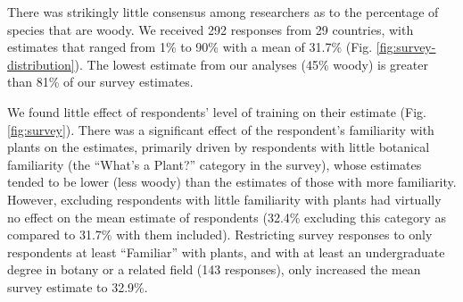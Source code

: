There was strikingly little consensus among researchers as to the
percentage of species that are woody.  We received 292 responses from
29 countries, with estimates that ranged from 1\% to 90\% with a mean
of 31.7\% (Fig. \ref{fig:survey-distribution}).  The lowest
estimate from our analyses (45\% woody) is greater than 81\% of our survey estimates.

We found little effect of respondents' level of training on their
estimate (Fig. \ref{fig:survey}).  There was a significant effect of
the respondent's familiarity with plants on the estimates, primarily
driven by respondents with little botanical familiarity (the ``What's
a Plant?'' category in the survey), whose estimates tended to be lower (less woody)
than the estimates of those with more familiarity. However, excluding
respondents with little familiarity with plants had virtually no effect
on the mean estimate of respondents (32.4\% excluding this category as compared
to 31.7\% with them included).
Restricting survey responses to only respondents at least ``Familiar''
with plants, and with at least an undergraduate degree in botany or a
related field (143 responses), only increased the mean survey estimate
to 32.9\%.

